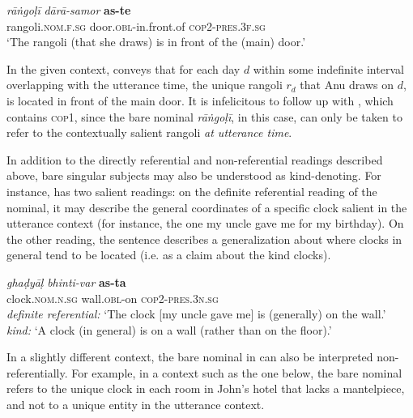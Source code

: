 \documentclass[output=paper,hidelinks]{langscibook}
\begin{document}
\begin{exe}
\begin{xlist}
\ex
\gll \emph{rā\.{n}goḷī} \emph{dārā-samor} \textbf{as-te}\\
rangoli.\textsc{nom.f.sg} door.\textsc{obl}-in.front.of \textsc{cop2-pres.3f.sg}\\
\glt `The rangoli (that she draws) is in front of the (main) door.'\label{rangolib}
\z
\z
{}

In the given context,  conveys that for each day $d$ within some indefinite interval overlapping with the utterance time, the unique rangoli $r_d$ that Anu draws on $d$, is located in front of the main door. It is infelicitous to follow up  with , which contains \textsc{cop1}, since the bare nominal \emph{rā\.{n}goḷī}, in this case, can only be taken to refer to the contextually salient rangoli \emph{at utterance time}.

  \label{rangolic}
\z
{}

In addition to the directly referential and non-referential readings described above, bare singular subjects may also be understood as kind-denoting. For instance,  has two salient readings: on the definite referential reading of the nominal, it may describe the general coordinates of a specific clock salient in the utterance context (for instance, the one my uncle gave me for my birthday). On the other reading, the sentence describes a generalization about
where clocks in general tend to be located (i.e. as a claim about the kind clocks).

 \ea
\gll \emph{ghaḍyāḷ} \emph{bhinti-var} \textbf{as-ta}\\
clock.\textsc{nom.n.sg} wall.\textsc{obl}-on \textsc{cop2-pres.3n.sg}\\
\glt \emph{definite referential:} `The clock [my uncle gave me] is (generally) on the wall.' \label{clock}\\
\emph{kind:} `A clock (in general) is on a wall (rather than on the floor).'
\z
{}

In a slightly different context, the bare nominal in  can also be interpreted non-referentially. For example, in a context such as the one below, the bare nominal refers to the unique clock in each room in John's hotel that lacks a mantelpiece, and not to a unique entity in the utterance context.


\end{xlist}
\end{exe}
\end{document}

